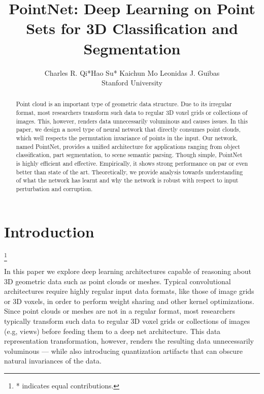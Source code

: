 \documentclass[10pt,twocolumn,letterpaper]{article}
\newcommand\blfootnote[1]{\begingroup
  \renewcommand\thefootnote{}\footnote{#1}\addtocounter{footnote}{-1}\endgroup
}
\begin{document}
\title{PointNet: Deep Learning on Point Sets for 3D Classification and Segmentation}



\author{Charles R. Qi*\qquad Hao Su* \qquad Kaichun Mo \qquad Leonidas J. Guibas\\Stanford University}

\maketitle


\begin{abstract}
  

Point cloud is an important type of geometric data structure. Due to its irregular format, most researchers transform such data to regular 3D voxel grids or collections of images. This, however, renders data unnecessarily voluminous and causes issues. In this paper, we design a novel type of neural network that directly consumes point clouds, which well respects the permutation invariance of points in the input.  Our network, named PointNet, provides a unified architecture for applications ranging from object classification, part segmentation, to scene semantic parsing. Though simple, PointNet is highly efficient and effective. Empirically, it shows strong performance on par or even better than state of the art. Theoretically, we provide analysis towards understanding of what the network has learnt and why the network is robust with respect to input perturbation and corruption.



   
 \end{abstract}

\section{Introduction}
\blfootnote{* indicates equal contributions.}
\label{sec:intro}



In this paper we explore deep learning architectures capable of reasoning about 3D geometric data such as point clouds or meshes. Typical convolutional architectures require highly regular input data formats, like those of image grids or 3D voxels, in order to perform weight sharing and other kernel optimizations. Since point clouds or meshes are not in a regular format, most researchers typically transform such data to regular 3D voxel grids or collections of images (e.g, views) before feeding them to a deep net architecture. This data representation transformation, however, renders the resulting data unnecessarily voluminous --- while also introducing quantization artifacts that can obscure natural invariances of the data. 
\end{document}
